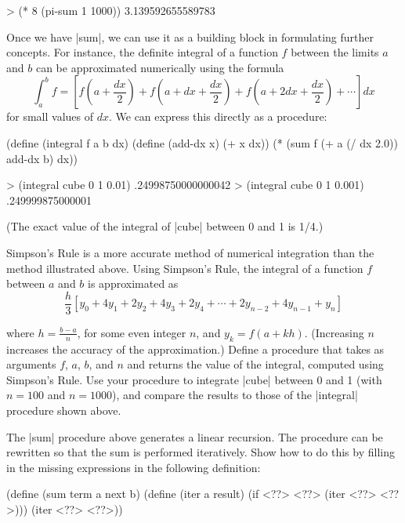 \begin{schemedisplay}
> (* 8 (pi-sum 1 1000))
3.139592655589783
\end{schemedisplay}


Once we have \scheme|sum|, we can use it as a building block in
formulating further concepts.  For instance, the definite integral of a
function $f$ between the limits $a$ and $b$ can be approximated
numerically using the formula
\begin{displaymath}
  \int^b_a f = \left[
    f\left(a + \frac{dx}{2}\right) +
    f\left(a + dx + \frac{dx}{2}\right) +
    f\left(a + 2dx + \frac{dx}{2}\right) +
    \cdots
  \right]
  dx
\end{displaymath}
for small values of $dx$.  We can express this directly as a
procedure:

\begin{schemedisplay}
(define (integral f a b dx)
  (define (add-dx x) (+ x dx))
  (* (sum f (+ a (/ dx 2.0)) add-dx b)
     dx))

> (integral cube 0 1 0.01)
.24998750000000042
> (integral cube 0 1 0.001)
.249999875000001
\end{schemedisplay}
(The exact value of the integral of \scheme|cube| between 0 and 1 is 1/4.)

\begin{Exercise}
\label{exc:1.29}
Simpson's Rule is a more accurate method of numerical integration than
the method illustrated above.  Using Simpson's Rule, the integral of a
function $f$ between $a$ and $b$ is approximated as
\begin{displaymath}
  \frac{h}{3}[
    y_0 + 4y_1 + 2y_2 + 4y_3 + 2y_4 + \cdots + 2y_{n-2} + 4y_{n-1} + y_n
  ]
\end{displaymath}

where $h = \frac{b-a}{n}$, for some even integer $n$, and $y_k = f(a +
kh)$.  (Increasing $n$ increases the accuracy of the approximation.)
Define a procedure that takes as arguments $f$, $a$, $b$, and $n$ and
returns the value of the integral, computed using Simpson's Rule.  Use
your procedure to integrate \scheme|cube| between 0 and 1 (with $n =
100$ and $n = 1000$), and compare the results to those of the
\scheme|integral| procedure shown above.
\end{Exercise}

\begin{Exercise}
\label{exc:1.30}
 The \scheme|sum| procedure above generates a linear recursion.  The
procedure can be rewritten so that the sum is performed iteratively.
Show how to do this by filling in the missing expressions in the
following definition:

\begin{schemedisplay}
(define (sum term a next b)
  (define (iter a result)
    (if <??>
        <??>
        (iter <??> <??>)))
  (iter <??> <??>))
\end{schemedisplay}
\end{Exercise}

